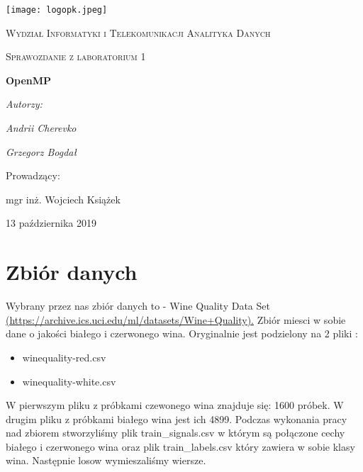 \documentclass{scrartcl}
\begin{document}
\begin{titlepage}
	\centering
	\texttt{[image: logopk.jpeg]}\par\vspace{1cm}
	{\scshape\LARGE 
	Wydział Informatyki i Telekomunikacji
	\newline Analityka Danych
	\par}
	\vspace{1cm}
	{\scshape\Large Sprawozdanie z laboratorium 1\par}
	\vspace{1.5cm}
	{\huge\bfseries OpenMP\par}
	\vspace{2cm}
	{\Large\itshape Autorzy:}\par
	\vspace{2cm}
	{\Large\itshape Andrii Cherevko}\par
	\texttt{}\par

	{\Large\itshape Grzegorz Bogdał}\par
	\texttt{}\par
	\vfill
	Prowadzący:\par
	mgr inż. Wojciech Książek

	\vfill

	{\large 13 października 2019\par}
\end{titlepage}

\section{Zbiór danych }
Wybrany przez nas zbiór danych to - Wine Quality Data Set
\url{(https://archive.ics.uci.edu/ml/datasets/Wine+Quality).}
 Zbiór miesci w sobie dane o jakości białego i czerwonego wina.
   Oryginalnie jest podzielony na 2 pliki : 
\begin{itemize}
  \item winequality-red.csv
  \item winequality-white.csv
\end{itemize}

W pierwszym pliku z próbkami czewonego wina znajduje się: 1600 próbek.
W drugim pliku z próbkami białego wina jest ich 4899.
Podczas wykonania pracy nad zbiorem stworzyliśmy plik train\_signals.csv
w którym są połączone cechy białego i czerwonego wina
oraz plik train\_labels.csv który zawiera w sobie klasy wina. Następnie losow wymieszaliśmy wiersze.
\end{document}
